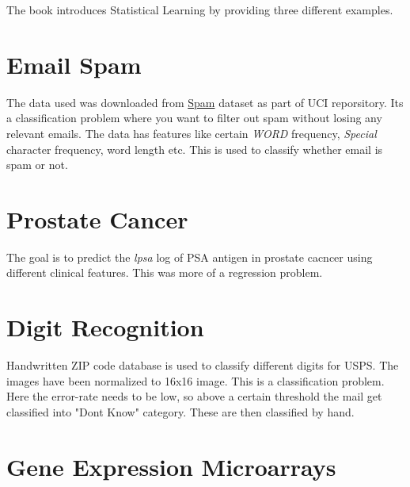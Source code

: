 \documentclass[12pt]{article}
\begin{document}
The book introduces Statistical Learning by providing three different examples.

\section{Email Spam}
The data used was downloaded from \href{https://archive.ics.uci.edu/ml/datasets/Spambase}{Spam}
dataset as part of UCI reporsitory. Its a classification problem where you want to filter out
spam without losing any relevant emails. The data has features like certain \textit{WORD} 
frequency, \textit{Special} character frequency, word length etc. This is used to classify
whether email is spam or not.

\section{Prostate Cancer}
The goal is to predict the \textit{lpsa} log of PSA antigen in prostate cacncer using different
clinical features. This was more of a regression problem.

\section{Digit Recognition}
Handwritten ZIP code database is used to classify different digits for USPS. The images have
been normalized to 16x16 image. This is a classification problem. Here the error-rate needs
to be low, so above a certain threshold the mail get classified into "Dont Know" category.
These are then classified by hand.

\section{Gene Expression Microarrays}
\end{document}
